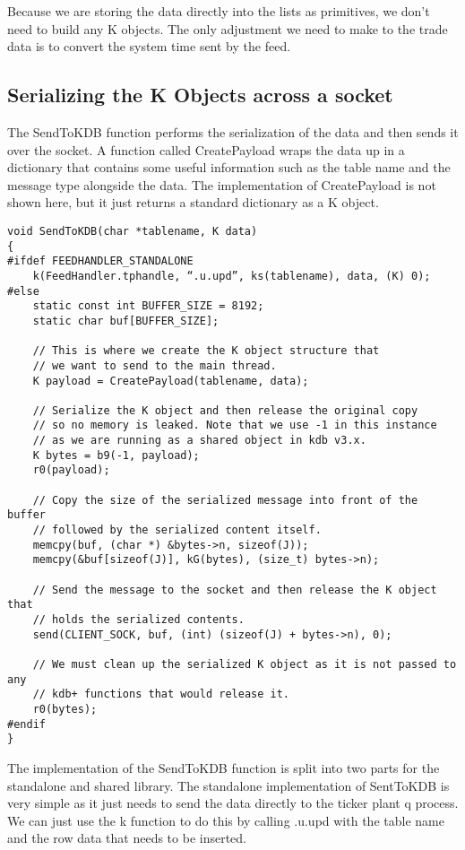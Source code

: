 Because we are storing the data directly into the lists as primitives, we don't need to build any K objects.
The only adjustment we need to make to the trade data is to convert the system time sent by the feed.

\subsection{Serializing the K Objects across a socket}

The SendToKDB function performs the serialization of the data and then sends it over the socket. A function called
CreatePayload wraps the data up in a dictionary that contains some useful information such as the table name and the
message type alongside the data. The implementation of CreatePayload is not shown here, but it just returns a standard
dictionary as a K object.

\begin{lstlisting}
void SendToKDB(char *tablename, K data)
{
#ifdef FEEDHANDLER_STANDALONE
	k(FeedHandler.tphandle, “.u.upd”, ks(tablename), data, (K) 0);
#else
	static const int BUFFER_SIZE = 8192;
	static char buf[BUFFER_SIZE];

	// This is where we create the K object structure that
	// we want to send to the main thread.
	K payload = CreatePayload(tablename, data);

	// Serialize the K object and then release the original copy
	// so no memory is leaked. Note that we use -1 in this instance
	// as we are running as a shared object in kdb v3.x.
	K bytes = b9(-1, payload);
	r0(payload);

	// Copy the size of the serialized message into front of the buffer
	// followed by the serialized content itself.
	memcpy(buf, (char *) &bytes->n, sizeof(J));
	memcpy(&buf[sizeof(J)], kG(bytes), (size_t) bytes->n);

	// Send the message to the socket and then release the K object that
	// holds the serialized contents.
	send(CLIENT_SOCK, buf, (int) (sizeof(J) + bytes->n), 0);

	// We must clean up the serialized K object as it is not passed to any
	// kdb+ functions that would release it.
	r0(bytes);
#endif
}
\end{lstlisting}

The implementation of the SendToKDB function is split into two parts for the standalone and shared library. The standalone
implementation of SentToKDB is very simple as it just needs to send the data directly to the ticker plant q process. We can
just use the k function to do this by calling .u.upd with the table name and the row data that needs to be inserted.

